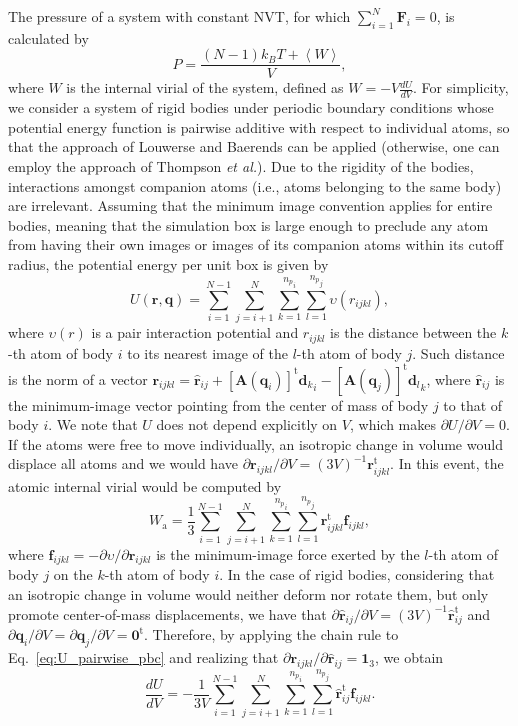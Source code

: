 \documentclass[aip,jcp,reprint,amsmath,amssymb]{revtex4-1}
\newcommand{\mt}[1]{\boldsymbol{\mathbf{#1}}}           %
\newcommand{\vt}[1]{\boldsymbol{\mathbf{#1}}}           %
\newcommand{\tr}[1]{#1^\text{t}}                               %
\begin{document}
The pressure of a system with constant NVT, for which $\sum_{i=1}^N{\vt F}_i = 0$, is calculated by\cite{Louwerse2006, Tuckerman2001}
\[
P = \frac{(N-1) k_B T + \left\langle W \right\rangle}{V},
\]
where $W$ is the internal virial of the system, defined as $W = - V \frac{dU}{dV}$. For simplicity, we consider a system of rigid bodies under periodic boundary conditions whose potential energy function is pairwise additive with respect to individual atoms, so that the approach of Louwerse and Baerends\cite{Louwerse2006} can be applied (otherwise, one can employ the approach of Thompson \textit{et al.}\cite{Thompson2009}). Due to the rigidity of the bodies, interactions amongst companion atoms (i.e., atoms belonging to the same body) are irrelevant. Assuming that the minimum image convention\cite{Allen1989} applies for entire bodies, meaning that the simulation box is large enough to preclude any atom from having their own images or images of its companion atoms within its cutoff radius, the potential energy per unit box is given by
\begin{equation}
\label{eq:U_pairwise_pbc}
U({\vt r}, {\vt q}) = \sum_{i=1}^{N-1} \sum_{j=i+1}^N \sum_{k=1}^{{n_p}_i} \sum_{l=1}^{{n_p}_j} \upsilon(r_{ijkl}),
\end{equation}
where $\upsilon(r)$ is a pair interaction potential and $r_{ijkl}$ is the distance between the $k$-th atom of body $i$ to its nearest image of the $l$-th atom of body $j$. Such distance is the norm of a vector ${\vt r}_{ijkl} = \hat{\vt r}_{ij} + \tr{[{\mt A}({\vt q}_i)]}{{\vt d}_k}_i - \tr{[{\mt A}({\vt q}_j)]}{{\vt d}_l}_k$, where $\hat{\vt r}_{ij}$ is the minimum-image vector pointing from the center of mass of body $j$ to that of body $i$. We note that $U$ does not depend explicitly on $V$, which makes ${\partial U}/{\partial V} = 0$. If the atoms were free to move individually, an isotropic change in volume would displace all atoms and we would have ${\partial {\vt r}_{ijkl}}/{\partial V} = (3V)^{-1} \tr{\vt r}_{ijkl}$.\cite{Louwerse2006} In this event, the atomic internal virial would be computed by
\begin{equation}
\label{eq:virial_atoms}
W_\text{a} = \frac{1}{3} \sum_{i=1}^{N-1} \sum_{j=i+1}^N \sum_{k=1}^{{n_p}_i} \sum_{l=1}^{{n_p}_j} \tr{\vt r}_{ijkl} {\vt f}_{ijkl},
\end{equation}
where $\vt f_{ijkl} = -{\partial \upsilon}/{\partial \vt r_{ijkl}}$ is the minimum-image force exerted by the $l$-th atom of body $j$ on the $k$-th atom of body $i$. In the case of rigid bodies, considering that an isotropic change in volume would neither deform nor rotate them, but only promote center-of-mass displacements, we have that ${\partial \hat{\vt r}_{ij}}/{\partial V} = (3V)^{-1} \tr{\hat{\vt r}}_{ij}$ and ${\partial {\vt q}_i}/{\partial V} = {\partial {\vt q}_j}/{\partial V} = \tr{\vt 0}$. Therefore, by applying the chain rule to Eq.~\ref{eq:U_pairwise_pbc} and realizing that $\partial \vt r_{ijkl}/\partial \hat{\vt r}_{ij} = \vt 1_3$, we obtain
\[
\label{eq:dUdV_rigid_bodies}
\frac{dU}{dV} = -\frac{1}{3V} \sum_{i=1}^{N-1} \sum_{j=i+1}^N \sum_{k=1}^{{n_p}_i} \sum_{l=1}^{{n_p}_j} \tr{\hat{\vt r}}_{ij} \vt f_{ijkl}.
\]
\end{document}
